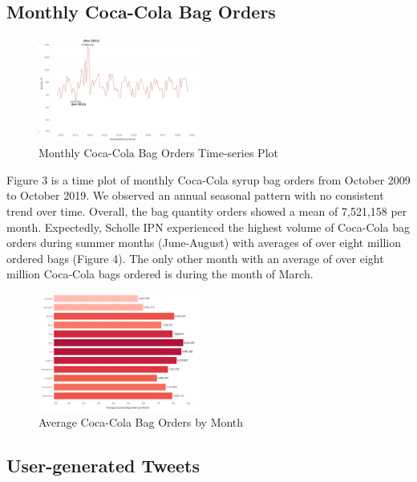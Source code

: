 \documentclass[12pt,oneside]{chicagocapstone}
\begin{document}
\hypertarget{monthly-coca-cola-bag-orders}{%
\subsection*{Monthly Coca-Cola Bag Orders}\label{monthly-coca-cola-bag-orders}}
\begin{figure}

{\centering \includegraphics[width=200px,angle = 0, scale=1.5]{figure/TSCoke} 

}

\caption{Monthly Coca-Cola Bag Orders Time-series Plot}\label{fig:TSCoke}
\end{figure}
Figure 3 is a time plot of monthly Coca-Cola syrup bag orders from October 2009 to October 2019. We observed an annual seasonal pattern with no consistent trend over time. Overall, the bag quantity orders showed a mean of 7,521,158 per month. Expectedly, Scholle IPN experienced the highest volume of Coca-Cola bag orders during summer months (June-August) with averages of over eight million ordered bags (Figure 4). The only other month with an average of over eight million Coca-Cola bags ordered is during the month of March.
\begin{figure}

{\centering \includegraphics[width=200px,angle = 0, scale=1.5]{figure/AveCokeBagOrderPerMonth} 

}

\caption{Average Coca-Cola Bag Orders by Month}\label{fig:AveCokeBagOrderPerMonth}
\end{figure}
\hypertarget{user-generated-tweets}{%
\subsection*{User-generated Tweets}\label{user-generated-tweets}}
\end{document}
